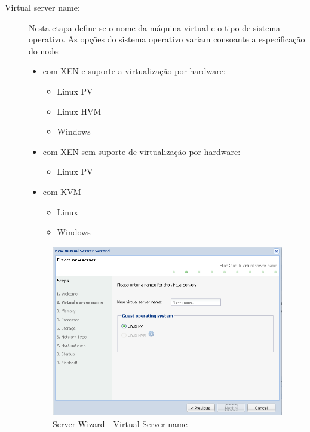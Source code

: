 \begin{description}
	\item[Virtual server name:] Nesta etapa define-se o nome da máquina virtual e o tipo de sistema operativo. As opções do sistema operativo variam consoante a especificação do node:
		\begin{itemize}
			\item com XEN e suporte a virtualização por hardware:
			\begin{itemize}
				\item Linux PV
				\item Linux HVM
				\item Windows
			\end{itemize}
 			\item com XEN sem suporte de virtualização por hardware:
			\begin{itemize}
				\item Linux PV
			\end{itemize}
 			\item com KVM
			\begin{itemize}
				\item Linux
				\item Windows
			\end{itemize}
		\end{itemize}
	
		\begin{figure}[H]
        		\begin{center}
		        \includegraphics[scale=0.5]{screenshots/server_createwiz_name.png}
        		\caption{Server Wizard - Virtual Server name}
	        	\label{fig:server_createwiz_name}
	        	\end{center}
		\end{figure}
 

\end{description}
